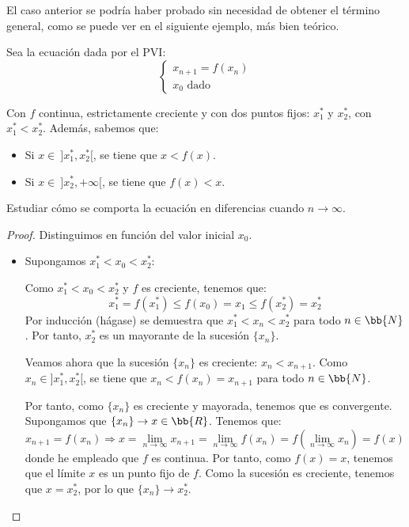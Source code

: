 El caso anterior se podría haber probado sin necesidad de obtener el término general, como se puede ver en el siguiente ejemplo, más bien teórico.
\begin{ejemplo}[Genérico]
    Sea la ecuación dada por el PVI:
    \begin{equation*}
    \left\{ \begin{array}{l}
        x_{n+1} = f(x_n) \\
        x_0 \text{\ dado}
    \end{array}\right.
    \end{equation*}
    \Func{f}{]x_1^\ast, +\infty[}{]x_1^\ast, +\infty[}{x}{f(x)}

    Con $f$ continua, estrictamente creciente y con dos puntos fijos: $x_1^\ast$ y $x_2^\ast$, con $x_1^\ast < x_2^\ast$. Además, sabemos que:
    \begin{itemize}
        \item Si $x\in~]x_1^\ast, x_2^\ast[$, se tiene que $x < f(x)$.

        \item Si $x\in~]x_2^\ast, +\infty[$, se tiene que $f(x) < x$.
    \end{itemize}
    Estudiar cómo se comporta la ecuación en diferencias cuando $n\to \infty$.

    \begin{proof}
        Distinguimos en función del valor inicial $x_0$.
    \begin{itemize}
        \item Supongamos $x_1^\ast < x_0 < x_2^\ast$:

        Como $x_1^\ast < x_0 < x_2^\ast$ y $f$ es creciente, tenemos que:
        \begin{equation*}
            x_1^\ast=f(x_1^\ast) \leq f(x_0)=x_1 \leq f(x_2^\ast) = x_2^\ast
        \end{equation*}
        Por inducción (hágase) se demuestra que $x_1^\ast < x_n < x_2^\ast$ para todo $n\in \bb{N}$. Por tanto, $x_2^\ast$ es un mayorante de la sucesión $\{x_n\}$.
        
        Veamos ahora que la sucesión $\{x_n\}$ es creciente: $x_n < x_{n+1}$. Como $x_n \in ]x_1^\ast, x_2^\ast[$, se tiene que             $x_n < f(x_n) = x_{n+1}$ para todo $n\in \bb{N}$.

        Por tanto, como $\{x_n\}$ es creciente y mayorada, tenemos que es convergente. Supongamos que $\{x_n\}\to x\in \bb{R}$. Tenemos que:
        \begin{equation*}
            x_{n+1} = f(x_n)
            \Longrightarrow
            x = \lim_{n\to \infty} x_{n+1} 
            = \lim_{n\to \infty}
            f(x_n) = f\left(\lim_{n\to \infty}x_n\right) = f(x)
        \end{equation*}
        donde he empleado que $f$ es continua. Por tanto, como $f(x)=x$, tenemos que el límite $x$ es un punto fijo de $f$. Como la sucesión es creciente, tenemos que $x=x_2^\ast$, por lo que $\{x_n\}\to x_2^\ast$.


\end{itemize}
\end{proof}
\end{ejemplo}
